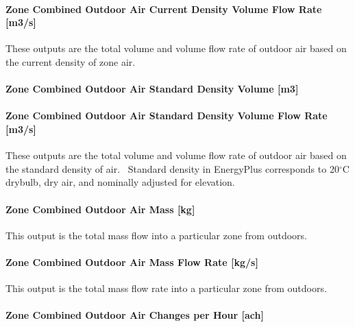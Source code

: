 \paragraph{Zone Combined Outdoor Air Current Density Volume Flow Rate {[}m3/s{]}}\label{zone-combined-outdoor-air-current-density-volume-flow-rate-m3s}

These outputs are the total volume and volume flow rate of outdoor air based on the current density of zone air.

\paragraph{Zone Combined Outdoor Air Standard Density Volume {[}m3{]}}\label{zone-combined-outdoor-air-standard-density-volume-m3}

\paragraph{Zone Combined Outdoor Air Standard Density Volume Flow Rate {[}m3/s{]}}\label{zone-combined-outdoor-air-standard-density-volume-flow-rate-m3s}

These outputs are the total volume and volume flow rate of outdoor air based on the standard density of air.~ Standard density in EnergyPlus corresponds to 20$^\circ$C drybulb, dry air, and nominally adjusted for elevation.

\paragraph{Zone Combined Outdoor Air Mass {[}kg{]}}\label{zone-combined-outdoor-air-mass-kg}

This output is the total mass flow into a particular zone from outdoors.

\paragraph{Zone Combined Outdoor Air Mass Flow Rate {[}kg/s{]}}\label{zone-combined-outdoor-air-mass-flow-rate-kgs}

This output is the total mass flow rate into a particular zone from outdoors.

\paragraph{Zone Combined Outdoor Air Changes per Hour {[}ach{]}}\label{zone-combined-outdoor-air-changes-per-hour-ach}

